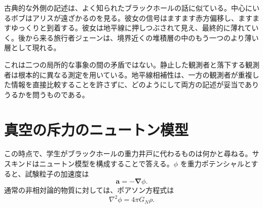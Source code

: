 古典的な外側の記述は、よく知られたブラックホールの話に似ている。中心にいるボブはアリスが遠ざかるのを見る。彼女の信号はますます赤方偏移し、ますますゆっくりと到着する。彼女は地平線に押しつぶされて見え、最終的に薄れていく。後から来る旅行者ジェーンは、境界近くの堆積層の中のもう一つのより薄い層として現れる。

\begin{classroomqa}
\end{classroomqa}

\begin{classroomqa}
\end{classroomqa}

これは二つの局所的な事象の間の矛盾ではない。静止した観測者と落下する観測者は根本的に異なる測定を用いている。地平線相補性は、一方の観測者が重複した情報を直接比較することを許さずに、どのようにして両方の記述が妥当でありうるかを問うものである。

\section{真空の斥力のニュートン模型}

この時点で、学生がブラックホールの重力井戸に代わるものは何かと尋ねる。サスキンドはニュートン模型を構成することで答える。\(\phi\) を重力ポテンシャルとすると、試験粒子の加速度は
\begin{equation}
\mathbf{a}=-\boldsymbol{\nabla}\phi.
\end{equation}
通常の非相対論的物質に対しては、ポアソン方程式は
\begin{equation}
\nabla^2\phi=4\pi G_N\rho.
\label{eq:l09-poisson}
\end{equation}

\begin{classroomqa}
\end{classroomqa}

